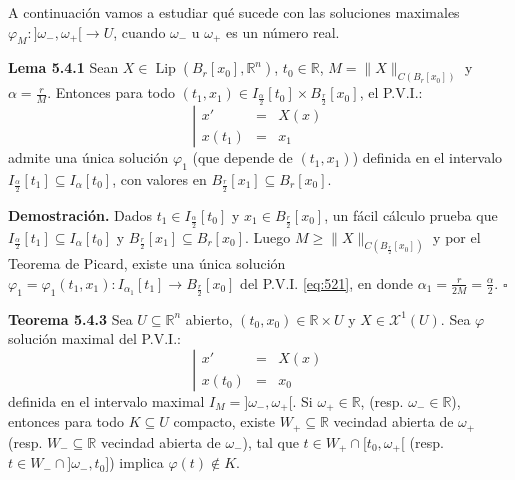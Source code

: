 \documentclass[11pt,a4paper]{article}
\theoremstyle{definition}
\theoremstyle{plain}
\theoremstyle{remark}
\begin{document}
	A continuación vamos a estudiar qué sucede con las soluciones maximales $\varphi_M : {]\omega_-, \omega_+[} \to U$, cuando $\omega_-$ u $\omega_+$ es un número real.
	
	\noindent \textbf{Lema 5.4.1} Sean $X \in \operatorname{Lip}(B_r[x_0], \mathbb{R}^n)$, $t_0 \in \mathbb{R}$, $M = \|X\|_{C(B_r[x_0])}$ y $\alpha = \frac{r}{M}$. Entonces para todo $(t_1, x_1) \in I_{\frac{\alpha}{2}}[t_0] \times B_{\frac{r}{2}}[x_0]$, el P.V.I.:
	\begin{equation}\label{eq:521}
		\left| 
		\begin{array}{lcl}
			x' &=& X(x) \\
			x(t_1) &=& x_1
		\end{array}
		\right.
	\end{equation}
	admite una única solución $\varphi_1$ (que depende de $(t_1, x_1)$) definida en el intervalo $I_{\frac{\alpha}{2}}[t_1] \subseteq I_\alpha[t_0]$, con valores en $B_{\frac{r}{2}}[x_1] \subseteq B_r[x_0]$.
	
	\noindent \textbf{Demostración.} Dados $t_1 \in I_{\frac{\alpha}{2}}[t_0]$ y $x_1 \in B_{\frac{r}{2}}[x_0]$, un fácil cálculo prueba que $I_{\frac{\alpha}{2}}[t_1] \subseteq I_\alpha[t_0]$ y $B_{\frac{r}{2}}[x_1] \subseteq B_r[x_0]$. Luego $M \ge \|X\|_{C(B_{\frac{r}{2}}[x_0])}$ y por el Teorema de Picard, existe una única solución $\varphi_1 = \varphi_1(t_1, x_1) : I_{\alpha_1}[t_1] \to B_{\frac{r}{2}}[x_0]$ del P.V.I. \eqref{eq:521}, en donde $\alpha_1 = \frac{r}{2M} = \frac{\alpha}{2}$. \hfill $\square$
	
	\noindent \textbf{Teorema 5.4.3} Sea $U \subseteq \mathbb{R}^n$ abierto, $(t_0, x_0) \in \mathbb{R} \times U$ y $X \in \mathcal{X}^1(U)$. Sea $\varphi$ solución maximal del P.V.I.:
	\begin{equation}\label{eq:522}
		\left| 
		\begin{array}{lcl}
			x' &=& X(x) \\
			x(t_0) &=& x_0
		\end{array}
		\right.
	\end{equation}
	definida en el intervalo maximal $I_M = {]\omega_-, \omega_+[}$. Si $\omega_+ \in \mathbb{R}$, (resp. $\omega_- \in \mathbb{R}$), entonces para todo $K \subseteq U$ compacto, existe $W_+ \subseteq \mathbb{R}$ vecindad abierta de $\omega_+$ (resp. $W_- \subseteq \mathbb{R}$ vecindad abierta de $\omega_-$), tal que $t \in W_+ \cap [t_0, \omega_+[$ (resp. $t \in W_- \cap {]\omega_-, t_0]}$) implica $\varphi(t) \notin K$.
	
\end{document}
